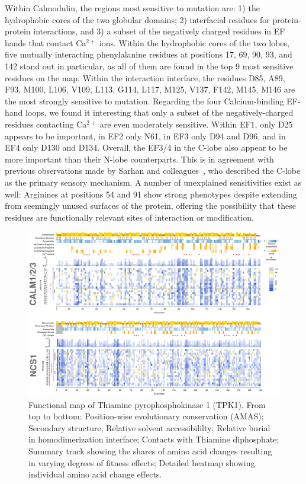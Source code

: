 Within Calmodulin, the regions most sensitive to mutation are: 1) the hydrophobic cores of the two globular domains; 2) interfacial residues for protein-protein interactions, and 3) a subset of the negatively charged residues in EF hands that contact Ca$^{2+}$ ions. Within the hydrophobic cores of the two lobes, five mutually interacting phenylalanine residues at positions 17, 69, 90, 93, and 142 stand out in particular, as all of them are found in the top 9 most sensitive residues on the map. Within the interaction interface, the residues D85, A89, F93, M100, L106, V109, L113, G114, L117, M125, V137, F142, M145, M146 are the most strongly sensitive to mutation. Regarding the four Calcium-binding EF-hand loops, we found it interesting that only a subset of the negatively-charged residues contacting Ca$^{2+}$ are even moderately sensitive. Within EF1, only D25 appears to be important, in EF2 only N61, in EF3 only D94 and D96, and in EF4 only D130 and D134. Overall, the EF3/4 in the C-lobe also appear to be more important than their N-lobe counterparts. This is in agreement with previous observations made by Sarhan and colleagues~\cite{sarhan_crystallographic_2012}, who described the C-lobe as the primary sensory mechanism. A number of unexplained sensitivities exist as well: Arginines at positions 54 and 91 show strong phenotypes despite extending from seemingly unused surfaces of the protein, offering the possibility that these residues are functionally relevant sites of interaction or modification.


\begin{landscape}
\begin{figure}[h!]
	\centering
	\includegraphics[width=9in]{img/calm+ncs1-maps.pdf}
	\caption{Functional map of Thiamine pyrophosphokinase 1 (TPK1). From top to bottom: Position-wise evolutionary conservation (AMAS); Secondary structure; Relative solvent accessibililty; Relative burial in homodimerization interface; Contacts with Thiamine diphosphate; Summary track showing the shares of amino acid changes resulting in varying degrees of fitness effects; Detailed heatmap showing individual amino acid change effects.}
	\label{fig:calm+ncs1-maps}
\end{figure}
\end{landscape}


